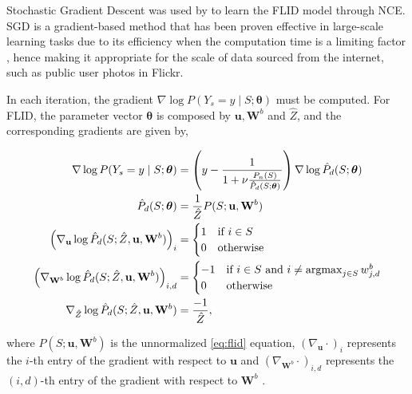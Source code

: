 Stochastic Gradient Descent was used by \citet{tschiatschek16learning} to learn the FLID model through NCE. SGD is a gradient-based method that has been proven effective in large-scale learning tasks due to its efficiency when the computation time is a limiting factor \citep{Bottou2010, Zhang2004}, hence making it appropriate for the scale of data sourced from the internet, such as public user photos in Flickr.

In each iteration, the gradient $\nabla \log{P(Y_{s} = y \mid S;\boldsymbol{\theta})}$ must be computed. For FLID, the parameter vector $\boldsymbol{\theta}$ is composed by $\mathbf{u}, \mathbf{W}^{b}$ and $\hat{Z}$, and the corresponding gradients are given by,

\begin{align}
  \label{eq:gradient-flid-1}
  \nabla \log{P(Y_{s} = y \mid S;\boldsymbol{\theta})} &= \left(y - \frac{1}{1 + \nu \frac{P_{n}(S)}{\hat{P}_{d}(S;\boldsymbol{\theta})}}\right) \nabla \log{\hat{P}_{d}(S;\boldsymbol{\theta})} \\
  \label{eq:gradient-flid-2}
  \hat{P}_{d}(S;\boldsymbol{\theta}) &= \frac{1}{\hat{Z}}P(S; \mathbf{u}, \mathbf{W}^{b}) \\
  \left(\nabla_{\mathbf{u}}\log{\hat{P}_{d}(S; \hat{Z}, \mathbf{u}, \mathbf{W}^{b})}\right)_{i} &= \begin{cases}
    1 &  \text{if}\ i \in S \\
    0 & \text{otherwise}
  \end{cases} \\
  \label{eq:gradient-flid-3}
  \left(\nabla_{\mathbf{W}^{b}}\log{\hat{P}_{d}(S; \hat{Z}, \mathbf{u}, \mathbf{W}^{b})}\right)_{i,d} &= \begin{cases}
    -1 & \text{if}\ i \in S\ \text{and}\ i \neq \operatorname*{argmax}_{j \in S}{w^{b}_{j,d}} \\
    0 & \text{otherwise}
  \end{cases} \\
  \label{eq:gradient-flid-4}
  \nabla_{\hat{Z}}\log{\hat{P}_{d}(S; \hat{Z}, \mathbf{u}, \mathbf{W}^{b})}&= \frac{-1}{\hat{Z}},
\end{align}

where $P(S;\mathbf{u}, \mathbf{W}^{b})$ is the unnormalized \eqref{eq:flid} equation, $\left(\nabla_{\mathbf{u}}\cdot \right)_{i}$ represents the $i$-th entry of the gradient with respect to $\mathbf{u}$ and $\left(\nabla_{\mathbf{W}^{b}}\cdot\right)_{i,d}$ represents the $(i,d)$-th entry of the gradient with respect to $\mathbf{W}^{b}$ \citep{tschiatschek16learning}.

